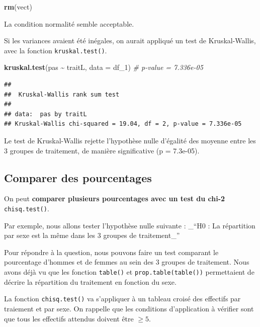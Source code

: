 \documentclass[
]{book}
\newenvironment{Shaded}{\begin{snugshade}}{\end{snugshade}}
\newcommand{\AttributeTok}[1]{\textcolor[rgb]{0.13,0.29,0.53}{#1}}
\newcommand{\CommentTok}[1]{\textcolor[rgb]{0.56,0.35,0.01}{\textit{#1}}}
\newcommand{\FunctionTok}[1]{\textcolor[rgb]{0.13,0.29,0.53}{\textbf{#1}}}
\newcommand{\NormalTok}[1]{#1}
\newcommand{\SpecialCharTok}[1]{\textcolor[rgb]{0.81,0.36,0.00}{\textbf{#1}}}
\begin{document}
\begin{Shaded}
\begin{Highlighting}[]
\FunctionTok{rm}\NormalTok{(vect)}
\end{Highlighting}
\end{Shaded}

La condition normalité semble acceptable.

Si les variances avaient été inégales, on aurait appliqué un test de Kruskal-Wallis, avec la fonction \texttt{kruskal.test()}.

\begin{Shaded}
\begin{Highlighting}[]
\FunctionTok{kruskal.test}\NormalTok{(pas }\SpecialCharTok{\textasciitilde{}}\NormalTok{ traitL, }\AttributeTok{data =}\NormalTok{ df\_1) }\CommentTok{\# p{-}value = 7.336e{-}05}
\end{Highlighting}
\end{Shaded}

\begin{verbatim}
## 
##  Kruskal-Wallis rank sum test
## 
## data:  pas by traitL
## Kruskal-Wallis chi-squared = 19.04, df = 2, p-value = 7.336e-05
\end{verbatim}

Le test de Kruskal-Wallis rejette l'hypothèse nulle d'égalité des moyenne entre les 3 groupes de traitement, de manière significative (p = 7.3e-05).

\subsection{Comparer des pourcentages}\label{comparer-des-pourcentages}

On peut \textbf{comparer plusieurs pourcentages avec un test du chi-2} \texttt{chisq.test()}.

Par exemple, nous allons tester l'hypothèse nulle suivante :
\_``H0 : La répartition par sexe est la même dans les 3 groupes de traitement\_''

Pour répondre à la question, nous pouvons faire un test comparant le pourcentage d'hommes et de femmes au sein des 3 groupes de traitement. Nous avons déjà vu que les fonction \texttt{table()} et \texttt{prop.table(table())} permettaient de décrire la répartition du traitement en fonction du sexe.

La fonction \texttt{chisq.test()} va s'appliquer à un tableau croisé des effectifs par traiement et par sexe. On rappelle que les conditions d'application à vérifier sont que tous les effectifs attendus doivent être \(\geq 5\).
\end{document}
